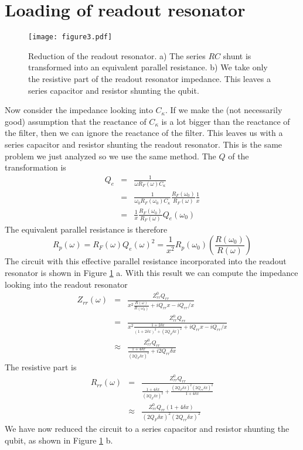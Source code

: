 \documentclass[english,aps,prl]{revtex4}
\begin{document}
\section{Loading of readout resonator}

\begin{figure}
\begin{centering}
\texttt{[image: figure3.pdf]} 
\par\end{centering}
\caption{Reduction of the readout resonator. a) The series $RC$ shunt is transformed into an equivalent parallel resistance. b) We take only the resistive part of the readout resonator impedance. This leaves a series capacitor and resistor shunting the qubit.}
\label{Fig:3}
\end{figure}

Now consider the impedance looking into $C_{\kappa}$. If we make the (not necessarily good) assumption that the reactance of $C_{\kappa}$ is a lot bigger than the reactance of the filter, then we can ignore the reactance of the filter. This leaves us with a series capacitor and resistor shunting the readout resonator. This is the same problem we just analyzed so we use the same method. The $Q$ of the transformation is \begin{eqnarray}
Q_e &=& \frac{1}{\omega R_F(\omega) C_{\kappa}} \\
&=& \frac{1}{\omega_0 R_F(\omega_0) C_{\kappa}} \frac{R_F(\omega_0)}{R_F(\omega)} \frac{1}{x} \\
&=& \frac{1}{x}\frac{R_F(\omega_0)}{R_F(\omega)} Q_e(\omega_0) \end{eqnarray}
The equivalent parallel resistance is therefore \begin{equation}
R_p(\omega) = R_F(\omega)Q_e(\omega)^2 = \frac{1}{x^2}R_p(\omega_0) \left( \frac{R(\omega_0)}{R(\omega)}\right) \end{equation}
The circuit with this effective parallel resistance incorporated into the readout resonator is shown in Figure \ref{Fig:3} a. With this result we can compute the impedance looking into the readout resonator \begin{eqnarray}
Z_{rr}(\omega) &=& \frac{Z_{rr}^0 Q_{rr}}{x^2 \frac{R(\omega)}{R(\omega_0)} +iQ_{rr}x - iQ_{rr}/x} \\
&=& \frac{Z_{rr}^0 Q_{rr}}{x^2 \frac{1+2\delta x}{(1+2\delta x)^2+(2 Q_F \delta x)^2} +iQ_{rr}x - iQ_{rr}/x} \\
&\approx&  \frac{Z_{rr}^0 Q_{rr}}{\frac{1+4\delta x}{(2 Q_F \delta x)^2} +i2Q_{rr}\delta x} \end{eqnarray}
The resistive part is \begin{eqnarray}
R_{rr}(\omega) &=& \frac{Z_{rr}^0Q_{rr}}{\frac{1+4\delta x}{(2Q_F \delta x)^2} + \frac{(2Q_F\delta x)^2(2Q_{rr}\delta x)^2}{1+4\delta x}} \\
&\approx& \frac{Z_{rr}^0Q_{rr}(1+4\delta x)}{(2Q_F\delta x)^2(2Q_{rr}\delta x)^2} \end{eqnarray}
We have now reduced the circuit to a series capacitor and resistor shunting the qubit, as shown in Figure \ref{Fig:3} b.
\end{document}
